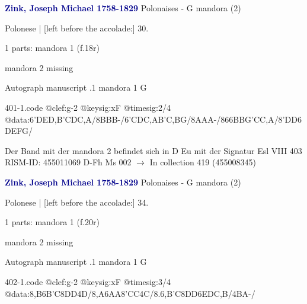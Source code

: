 \documentclass[twocolumn]{book}
\begin{document}
\newline \par \vspace{7pt} \textcolor{darkblue}{\textbf{Zink, Joseph Michael  1758-1829}}
\newline Polonaises - G
\newline mandora (2)
\newline \begin{itshape}[f.18r, at left:] Polonese | [left before the accolade:] 30.\end{itshape} 
\newline \textcolor{darkblue}{}  1 parts: mandora 1  (f.18r)
\newline \begin{small} mandora 2 missing\end{small} 
\newline Autograph manuscript
.1  mandora 1  G  
\begin{filecontents*}{401-1.code}
@clef:g-2
@keysig:xF
@timesig:2/4
@data:6'DED,B'CDC,A/8BBB-/6'CDC,AB'C,BG/8AAA-/866{BBG}{'CC,A}/8'DD{6DE}{FG}/
\end{filecontents*}
\newline
%

\newline Der Band mit der mandora 2 befindet sich in D Eu mit der Signatur Esl VIII 403
\newline RISM-ID: 455011069
\newline D-Fh  Ms 002
\newline $\rightarrow$ In collection 419 (455008345)
      
\newline \par \vspace{7pt} \textcolor{darkblue}{\textbf{Zink, Joseph Michael  1758-1829}}
\newline Polonaises - G
\newline mandora (2)
\newline \begin{itshape}[f.20r, at left:] Polonese | [left before the accolade:] 34.\end{itshape} 
\newline \textcolor{darkblue}{}  1 parts: mandora 1  (f.20r)
\newline \begin{small} mandora 2 missing\end{small} 
\newline Autograph manuscript
.1  mandora 1  G  
\begin{filecontents*}{402-1.code}
@clef:g-2
@keysig:xF
@timesig:3/4
@data:{8,B6B'C}8DD4D/{8,A6AA}{8'CC}4C/{8.6,B'C}8DD6EDC,B/4BA-/
\end{filecontents*}
\newline
%
\end{document}
